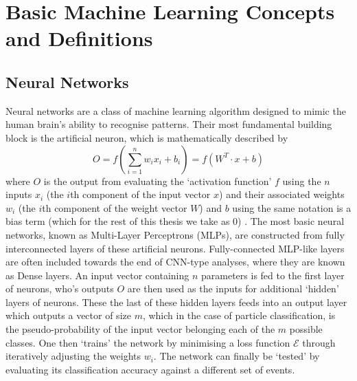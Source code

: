 \section{Basic Machine Learning Concepts and Definitions}

\subsection{Neural Networks}
Neural networks are a class of machine learning algorithm designed to mimic the human brain's ability to recognise patterns. Their most fundamental building block is the artificial neuron, which is mathematically described by
\begin{equation}
O=\mathit{f}(\sum_{i=1}^{n}w_ix_i+b_i)=\mathit{f}(W^T\cdot x +b)
\end{equation}
where $O$ is the output from evaluating the `activation function' $\mathit{f}$ using the $n$ inputs $x_i$ (the $i$th component of the input vector $x$) and their associated weights $w_i$ (the $i$th component of the weight vector $W$) and $b$ using the same notation is a bias term (which for the rest of this thesis we take as 0) \cite{C++CNN}. The most basic neural networks, known as Multi-Layer Perceptrons (MLPs), are constructed from fully interconnected layers of these artificial neurons. Fully-connected MLP-like layers are often included towards the end of CNN-type analyses, where they are known as Dense layers. An input vector containing $n$ parameters is fed to the first layer of neurons, who's outputs $O$ are then used as the inputs for additional `hidden' layers of neurons. These the last of these hidden layers feeds into an output layer which outputs a vector of size $m$, which in the case of particle classification, is the pseudo-probability of the input vector belonging each of the $m$ possible classes. One then `trains' the network by minimising a loss function $\mathcal{E}$ through iteratively adjusting the weights $w_i$.
The network can finally be `tested' by evaluating its classification accuracy against a different set of events.
